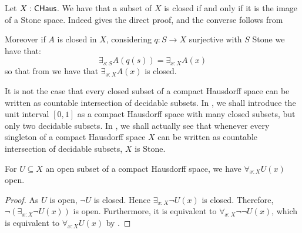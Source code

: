 \begin{remark}\label{InhabitedClosedSubSpaceClosedCHaus}
  Let $X:\mathsf{CHaus}$. We have that a subset of $X$ is closed if and only if it is the image of a Stone space. Indeed  gives the direct proof, and the converse follows from 
  
  Moreover if $A$ is closed in $X$, considering $q:S\to X$ surjective with $S$ Stone we have that:
  $$ \exists_{s:S}A(q(s)) = \exists_{x:X}A(x)$$
  so that from  we have that $\exists_{x:X} A(x)$ is closed. 
\end{remark}
\begin{remark}
  It is not the case that every closed subset of a compact Hausdorff space can be written 
  as countable intersection of decidable subsets. 
  In , we shall introduce the unit interval $[0,1]$ as a compact Hausdorff space with many closed 
  subsets, but only two decidable subsets. 
  In , we shall actually see that whenever every singleton of a compact Hausdorff space $X$
  can be written as countable intersection of decidable subsets, $X$ is Stone. 
\end{remark}


\begin{corollary}\label{AllOpenSubspaceOpen}
  For $U\subseteq X$ an open subset of a compact Hausdorff space, we have 
  $\forall_{x:X} U(x)$ open. 
\end{corollary}
\begin{proof}
  As $U$ is open, $\neg U$ is closed. 
  Hence $\exists_{x:X} \neg U(x)$ is closed. 
  Therefore, $\neg (\exists_{x:X} \neg U(x))$ is open. 
  Furthermore, it is equivalent to $\forall_{x:X} \neg \neg U(x)$, 
  which is equivalent to $\forall_{x:X} U(x)$ by .
\end{proof}


